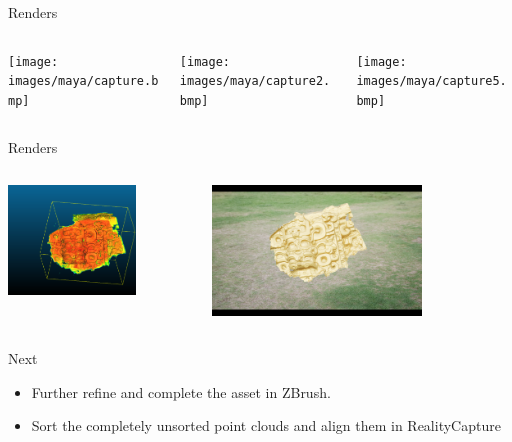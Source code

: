 \begin{frame}{Renders}
    \begin{columns}
       \begin{column}{0.3\textwidth}
        \texttt{[image: images/maya/capture.bmp]}
       \end{column}
       \begin{column}{0.3\textwidth}
        \texttt{[image: images/maya/capture2.bmp]}
       \end{column}
       \begin{column}{0.3\textwidth}
        \texttt{[image: images/maya/capture5.bmp]}
       \end{column}
   \end{columns}
\end{frame}

\begin{frame}{Renders}
    \begin{columns}
       \begin{column}{0.5\textwidth}
        \includegraphics[height=0.7\textheight,width=0.7\textwidth,keepaspectratio]{images/maya/capture4.bmp}
       \end{column}
       \begin{column}{0.5\textwidth}
        \includegraphics[height=0.7\textheight,width=0.7\textwidth,keepaspectratio]{images/maya/render.png}
       \end{column}
   \end{columns}
\end{frame}

\begin{frame}{Next}
    \begin{itemize}
       \item Further refine and complete the asset in ZBrush.
       \item Sort the completely unsorted point clouds and align them in RealityCapture
   \end{itemize}    
\end{frame}
